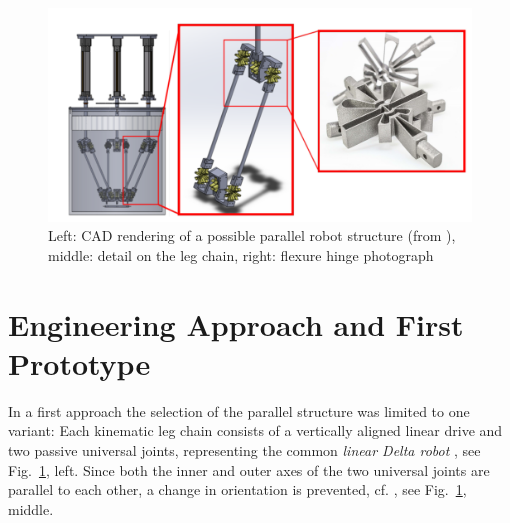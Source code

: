 \documentclass{svproc}
\begin{document}
\begin{figure}[hb]
   
    \centering
    \vspace{-0.5cm} %
	\includegraphics[width=\textwidth,height=\textheight,keepaspectratio]{figures/Demonstrator_transp.png}
    \vspace{-0.4cm} %
	\caption{Left: CAD rendering of a possible parallel robot structure (from  \cite{JahnRaatz2020}), middle: detail on the leg chain, right: flexure hinge photograph}
    \vspace{-0.4cm} %
	\label{fig:Demonstrator}
\end{figure}

\section{Engineering Approach and First Prototype}
\label{sec:engineering_synthesis}



In a first approach the selection of the parallel structure was limited to one variant:
Each kinematic leg chain consists of a vertically aligned linear drive and two passive universal joints, representing the common \emph{linear Delta robot} \cite{FrindtKreHes2010,KelaiaiaComZaa2012}, see Fig.~\ref{fig:Demonstrator}, left. 
Since both the inner and outer axes of the two universal joints are parallel to each other, a change in orientation is prevented, cf. \cite{Merlet2006,KongGos2007,Gogu2008,FrindtKreHes2010}, see Fig.~\ref{fig:Demonstrator}, middle. 
\end{document}
